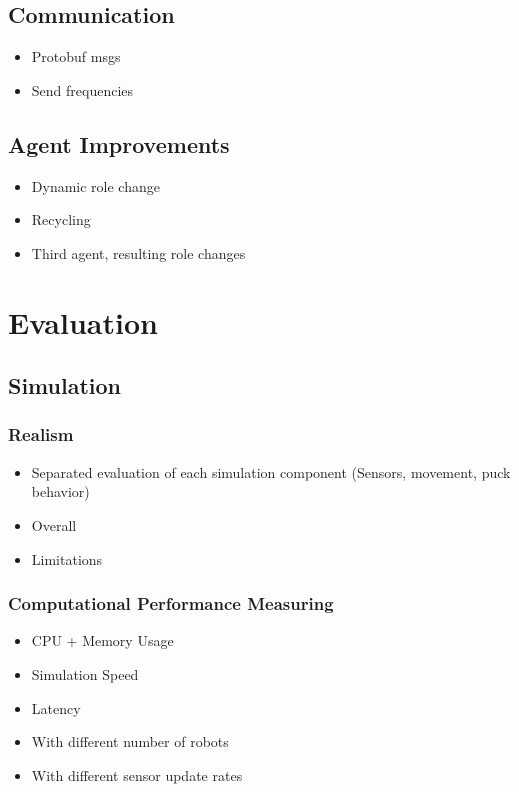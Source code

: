 \documentclass[a4paper,11pt]{article}
\begin{document}
\subsection{Communication}
\begin{itemize}
\item Protobuf msgs
\item Send frequencies
\end{itemize}
\subsection{Agent Improvements}
\begin{itemize}
\item Dynamic role change
\item Recycling
\item Third agent, resulting role changes
\end{itemize}


\section{Evaluation}
\subsection{Simulation}
\subsubsection{Realism}
\begin{itemize}
\item Separated evaluation of each simulation component (Sensors, movement, puck behavior)
\item Overall
\item Limitations
\end{itemize}
\subsubsection{Computational Performance Measuring}
\begin{itemize}
\item CPU + Memory Usage
\item Simulation Speed
\item Latency
\item With different number of robots
\item With different sensor update rates
\end{itemize}
\end{document}

